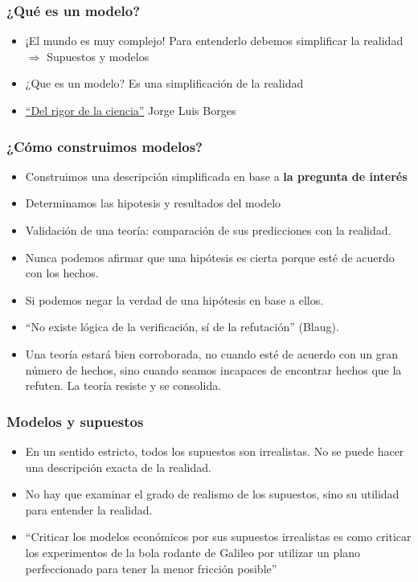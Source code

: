 \documentclass{beamer}
\begin{document}
\begin{frame}
\frametitle{¿Qué es un modelo?}
\begin{itemize}
    \item ¡El mundo es muy complejo! Para entenderlo debemos simplificar la realidad \vspace{2mm} \\ $\Rightarrow$
    Supuestos y modelos \vspace{2mm}
    \item ¿Que es un modelo? Es una simplificación de la realidad \vspace{2mm}
    \item  \href{https://www.youtube.com/watch?v=zwDA3GmcwJU}{``Del rigor de la ciencia''} 
    Jorge Luis Borges
\end{itemize}
\end{frame}

\begin{frame}
\frametitle{¿Cómo construimos modelos?}
\begin{itemize}
\item Construimos una descripción simplificada en base a \textbf{la pregunta de interés}
\item Determinamos las hipotesis y resultados del modelo 
\item Validación de una teoría: comparación de sus predicciones con la realidad.
\item Nunca podemos afirmar que una hipótesis es cierta porque esté de acuerdo con los hechos.
\item Si podemos negar la verdad de una hipótesis en base a ellos.
\item “No existe lógica de la verificación, sí de la refutación” (Blaug).
\item Una teoría estará bien corroborada, no cuando esté de acuerdo con un gran número de hechos, sino cuando seamos incapaces de encontrar hechos que la refuten. La teoría resiste y se consolida.
\end{itemize} 
\end{frame}

\begin{frame}
\frametitle{Modelos y supuestos}
\begin{itemize}
    \item En un sentido estricto, todos los supuestos son irrealistas. No se puede hacer una descripción exacta de la realidad. \vspace{2mm}
    \item No hay que examinar el grado de realismo de los supuestos, sino su utilidad para entender la realidad. \vspace{2mm}
    \item “Criticar los modelos económicos por sus supuestos irrealistas es como criticar los experimentos de la bola rodante de Galileo por utilizar un plano perfeccionado para tener la menor fricción posible”
\end{itemize}
\end{frame}
\end{document}
